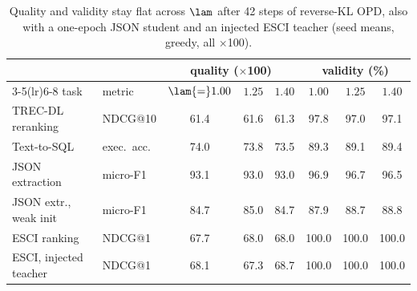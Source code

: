 \begin{table}[t]
\centering
\small
\setlength{\tabcolsep}{5pt}
\begin{tabular}{@{}llcccccc@{}}
\toprule
 & & \multicolumn{3}{c}{quality ($\times$100)} & \multicolumn{3}{c}{validity (\%)} \\
\cmidrule(lr){3-5}\cmidrule(lr){6-8}
task & metric & $\lam{=}1.00$ & $1.25$ & $1.40$ & $1.00$ & $1.25$ & $1.40$ \\
\midrule
TREC-DL reranking & NDCG@10 & 61.4 & 61.6 & 61.3 & 97.8 & 97.0 & 97.1 \\ %
Text-to-SQL & exec.\ acc. & 74.0 & 73.8 & 73.5 & 89.3 & 89.1 & 89.4 \\ %
JSON extraction & micro-F1 & 93.1 & 93.0 & 93.0 & 96.9 & 96.7 & 96.5 \\ %
JSON extr., weak init & micro-F1 & 84.7 & 85.0 & 84.7 & 87.9 & 88.7 & 88.8 \\ %
ESCI ranking & NDCG@1 & 67.7 & 68.0 & 68.0 & 100.0 & 100.0 & 100.0 \\ %
ESCI, injected teacher & NDCG@1 & 68.1 & 67.3 & 68.7 & 100.0 & 100.0 & 100.0 \\ %
\bottomrule
\end{tabular}
\caption{Quality and validity stay flat across $\lam$ after 42 steps of reverse-KL OPD, also with a one-epoch JSON student and an injected ESCI teacher (seed means, greedy, all $\times$100).}
\label{tab:crosstask_full}
\end{table}
